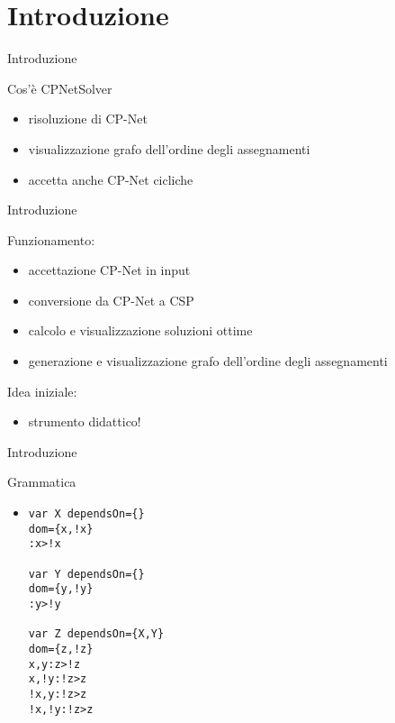 \section{Introduzione}
\begin{frame}{Introduzione}

Cos'è CPNetSolver
\begin{itemize}
  \item risoluzione di CP-Net
  \item visualizzazione grafo dell'ordine degli assegnamenti
  \item accetta anche CP-Net cicliche
\end{itemize}
\end{frame}

\begin{frame}{Introduzione}

Funzionamento:
\begin{itemize}
  \item accettazione CP-Net in input
  \item conversione da CP-Net a CSP
  \item calcolo e visualizzazione soluzioni ottime
  \item generazione e visualizzazione grafo dell'ordine degli assegnamenti
\end{itemize}

Idea iniziale:
\begin{itemize}
  \item strumento didattico!
  
\end{itemize}
\end{frame}

\begin{frame}[fragile]{Introduzione}

Grammatica
\begin{itemize}
\item
\begin{verbatim}
var X dependsOn={}
dom={x,!x}
:x>!x

var Y dependsOn={}
dom={y,!y}
:y>!y

var Z dependsOn={X,Y}
dom={z,!z}
x,y:z>!z
x,!y:!z>z
!x,y:!z>z
!x,!y:!z>z
\end{verbatim}
\end{itemize}
\end{frame}
